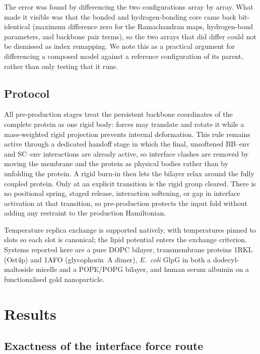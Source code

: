 \documentclass[journal=jctcce,manuscript=article,layout=twocolumn]{achemso}
\begin{document}
The error was found by differencing the two configurations array by array. What made
it visible was that the bonded and hydrogen-bonding core came back bit-identical
(maximum difference zero for the Ramachandran maps, hydrogen-bond parameters, and
backbone pair terms), so the two arrays that did differ could not be dismissed as
index remapping. We note this as a practical argument for differencing a composed
model against a reference configuration of its parent, rather than only testing that
it runs.

\subsection{Protocol}
\label{sec:protocol}

All pre-production stages treat the persistent backbone coordinates of the complete
protein as one rigid body: forces may translate and rotate it while a mass-weighted
rigid projection prevents internal deformation. This rule remains active through a
dedicated handoff stage in which the final, unsoftened BB--env and SC--env
interactions are already active, so interface clashes are removed by moving the
membrane and the protein as physical bodies rather than by unfolding the protein. A
rigid burn-in then lets the bilayer relax around the fully coupled protein. Only at
an explicit transition is the rigid group cleared. There is no positional spring,
staged release, interaction softening, or gap in interface activation at that
transition, so pre-production protects the input fold without adding any restraint
to the production Hamiltonian.

Temperature replica exchange is supported natively, with temperatures pinned to slots
so each slot is canonical; the lipid potential enters the exchange criterion.
Systems reported here are a pure DOPC bilayer, transmembrane proteins 1RKL (Ost4p)
and 1AFO (glycophorin~A dimer), \emph{E.~coli} GlpG in both a dodecyl-maltoside
micelle and a POPE/POPG bilayer, and human serum albumin on a functionalised gold
nanoparticle.

\section{Results}

\subsection{Exactness of the interface force route}
\label{sec:exactness}
\end{document}
